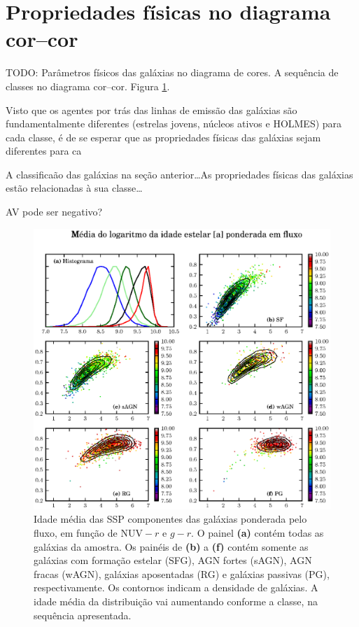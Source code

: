 
\section{Propriedades físicas no diagrama cor--cor}
\label{sec:Analise:PropFisicas}

TODO: Parâmetros físicos das galáxias no diagrama de cores. A sequência de
classes no diagrama cor--cor. Figura \ref{fig:ATFluxColor}.

Visto que os agentes por trás das linhas de emissão das galáxias são
fundamentalmente diferentes (estrelas jovens, núcleos ativos e HOLMES) para
cada classe, é de se esperar que as propriedades físicas das galáxias sejam
diferentes para ca


A classificaão das galáxias na seção anterior\ldots As propriedades físicas das
galáxias estão relacionadas à sua classe\ldots

AV pode ser negativo?

\begin{figure}
	\includegraphics{figuras/uvcolor-color-at_flux-byclass.eps}
	\caption[Idade média das SSP ponderada em fluxo no diagrama cor--cor UV.]
	{Idade média das SSP componentes das galáxias ponderada pelo fluxo, em função
	de $\mathrm{NUV}-r$ e $g-r$. O painel \textbf{(a)} contém todas as galáxias da
	amostra. Os painéis de \textbf{(b)} a \textbf{(f)} contém somente as galáxias
	com formação estelar (SFG), AGN fortes (sAGN), AGN fracas (wAGN), galáxias
	aposentadas (RG) e galáxias passivas (PG), respectivamente. Os contornos
	indicam a densidade de galáxias. A idade média da distribuição vai aumentando
	conforme a classe, na sequência apresentada.}
	\label{fig:ATFluxColor}
\end{figure}

